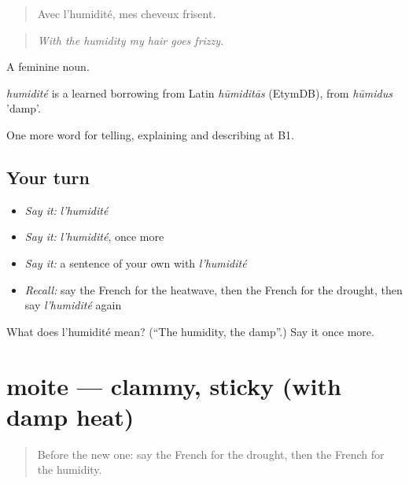 \begin{quote}
Avec l'humidité, mes cheveux frisent.
\end{quote}

\begin{quote}
\emph{With the humidity my hair goes frizzy.}
\end{quote}

A feminine noun.

\begin{cousinweb}
\emph{humidité} is a learned borrowing from Latin \emph{hūmiditās} (EtymDB), from \emph{hūmidus} 'damp'.
\end{cousinweb}

\begin{grammarlens}[title={What you've built}]
One more word for telling, explaining and describing at B1.
\end{grammarlens}

\subsection*{Your turn}
\begin{itemize}
\raggedright
  \item \emph{Say it:} \emph{l'humidité}
  \item \emph{Say it:} \emph{l'humidité}, once more
  \item \emph{Say it:} a sentence of your own with \emph{l'humidité}
  \item \emph{Recall:} say the French for the heatwave, then the French for the drought, then say \emph{l'humidité} again
\end{itemize}

\begin{tcolorbox}[breakable,colback=teal!4,colframe=teal!35!black,title={Before you move on}]
What does l'humidité mean? (\textquotedblleft{}The humidity, the damp\textquotedblright{}.) Say it once more.
\end{tcolorbox}
\section[moite]{moite — clammy, sticky (with damp heat)}

\label{lesson:FR-C464-moite}



\begin{quote}
Before the new one: say the French for the drought, then the French for the humidity.
\end{quote}

